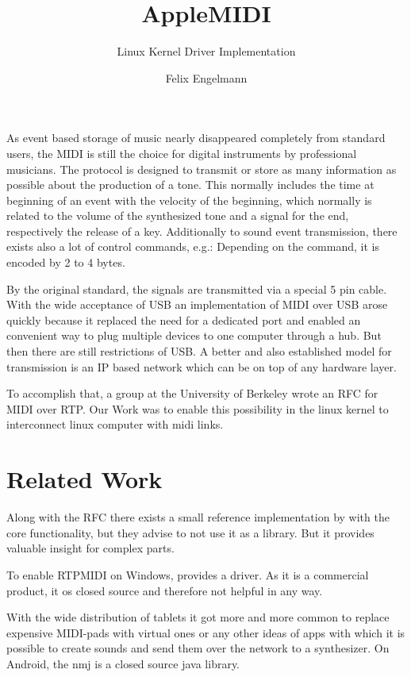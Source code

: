 \documentclass[paper=a4,fontsize=11pt,pagesize,bibtotoc]{scrartcl}
\title{AppleMIDI}
\subtitle{Linux Kernel Driver Implementation}
\author{Felix Engelmann}
\begin{document}
	\maketitle
	
	As event based storage of music nearly disappeared completely from standard users, the 
	MIDI 
	is still the choice for digital instruments by professional musicians. The protocol is designed to transmit or store as many information as possible about the production of a tone. This normally includes the time at beginning of an event with the velocity of the beginning, which normally is related to the volume of the synthesized tone and a signal for the end, respectively the release of a key. Additionally to sound event transmission, there exists also a lot of control commands, e.g.:
	Depending on the command, it is encoded by 2 to 4 bytes.
	
	By the original standard, the signals are transmitted via a special 5 pin cable. With the wide acceptance of USB an implementation of MIDI over USB arose quickly because it replaced the need for a dedicated port and enabled an convenient way to plug multiple devices to one computer through a hub. But then there are still restrictions of USB. A better and also established model for transmission is an IP based network which can be on top of any hardware layer.
	
	To accomplish that, a group at the University of Berkeley wrote an RFC for MIDI over RTP. Our Work was to enable this possibility in the linux kernel to interconnect linux computer with midi links.
	
	\section{Related Work}
	Along with the RFC there exists a small reference implementation by 
	with the core functionality, but they advise to not use it as a library. But it provides valuable insight for complex parts.
	
	To enable RTPMIDI on Windows,
	provides a driver. As it is a commercial product, it os closed source and therefore not helpful in any way.
	
	With the wide distribution of tablets it got more and more common to replace expensive MIDI-pads with virtual ones or any other ideas of apps with which it is possible to create sounds and send them over the network to a synthesizer. On Android, the nmj is a closed source java library.
	
\end{document}
